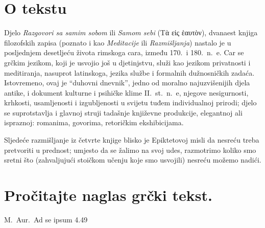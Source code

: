 


\section*{O tekstu}

Djelo \textit{Razgovori sa samim sobom} ili \textit{Samom sebi} \textgreek[variant=ancient]{(Τὰ εἰς ἑαυτὸν),} dvanaest knjiga filozofskih zapisa (poznato i kao \textit{Meditacije} ili \textit{Razmišljanja}) nastalo je u posljednjem desetljeću života rimskoga cara, između 170.\ i 180.\ n.~e. Car se grčkim jezikom, koji je usvojio još u djetinjstvu, služi kao jezikom privatnosti i meditiranja, nasuprot latinskoga, jezika službe i formalnih dužnosničkih zadaća. Istovremeno, ovaj je ``duhovni dnevnik'', jedno od moralno najuzvišenijih djela antike, i dokument kulturne i psihičke klime II.~st.\ n.~e, njegove nesigurnosti, krhkosti, usamljenosti i izgubljenosti u svijetu tuđem individualnoj prirodi; djelo se suprotstavlja i glavnoj struji tadašnje književne produkcije, elegantnoj ali ispraznoj: romanima, govorima, retoričkim ekshibicijama.

Sljedeće razmišljanje iz četvrte knjige blisko je Epiktetovoj misli da nesreću treba pretvoriti u prednost; umjesto da se žalimo na svoj udes, razmotrimo koliko smo sretni što (zahvaljujući stoičkom učenju koje smo usvojili) nesreću možemo nadići.

\section*{Pročitajte naglas grčki tekst.}

M.\ Aur.\ Ad se ipsum 4.49


\medskip


